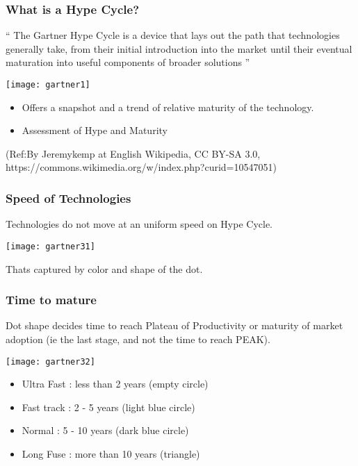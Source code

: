 \begin{frame}[fragile]\frametitle{What is a Hype Cycle?}

`` The Gartner Hype Cycle is a device that lays out the path that technologies generally take, from their initial introduction into the market until their eventual maturation into useful components of broader solutions '' 


\begin{center}
\texttt{[image: gartner1]}
\end{center}

\begin{itemize}
\item Offers a snapshot and a trend of relative maturity of the technology.
\item Assessment of Hype and Maturity

\end{itemize}

{\tiny (Ref:By Jeremykemp at English Wikipedia, CC BY-SA 3.0, https://commons.wikimedia.org/w/index.php?curid=10547051)}

\end{frame}



\begin{frame}[fragile]\frametitle{Speed of Technologies}

Technologies do not move at an uniform speed on Hype Cycle.

\begin{center}
\texttt{[image: gartner31]}
\end{center}


 Thats captured by color and shape of the dot. 
\end{frame}

\begin{frame}[fragile]\frametitle{Time to mature}


Dot shape decides time to reach Plateau of Productivity or maturity of market adoption (ie the last stage, and not the time to reach PEAK).

\begin{center}
\texttt{[image: gartner32]}
\end{center}



\begin{itemize}
\item Ultra Fast : less than 2 years (empty circle)
\item Fast track : 2 - 5 years (light blue circle)
\item Normal : 5 - 10 years (dark blue circle)
\item Long Fuse : more than 10 years (triangle)
\end{itemize}
\end{frame}





